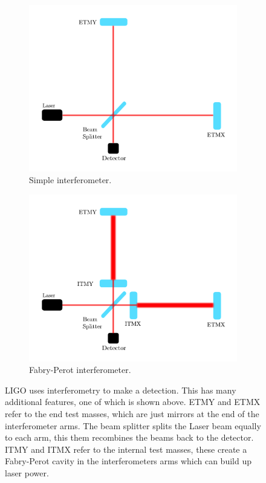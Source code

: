\begin{figure}[hp]
    \centering
    \begin{subfigure}[h]{0.6\linewidth}
    	 \includegraphics[width=\textwidth]{C1_intro/interferometer.pdf}
    	 \caption{Simple interferometer.}
    	 \label{detectors:interferometer:simple}
    \end{subfigure}
	\begin{subfigure}[h]{0.6\linewidth}
		\includegraphics[width=\textwidth]{C1_intro/interferometer_fabry.pdf}
		\caption{Fabry-Perot interferometer.}
		\label{detectors:interferometer:fabry}
	\end{subfigure}
    \caption[Basic layout of the \gls{LIGO} detectors.]{\gls{LIGO} uses interferometry to make a detection. This has many additional features, one of which is shown above. ETMY and ETMX refer to the end test masses, which are just mirrors at the end of the interferometer arms. The beam splitter splits the Laser beam equally to each arm, this them recombines the beams back to the detector.
    ITMY and ITMX refer to the internal test masses, these create a Fabry-Perot cavity in the interferometers arms which can build up laser power. }
    \label{detectors:interferometer}
\end{figure}
